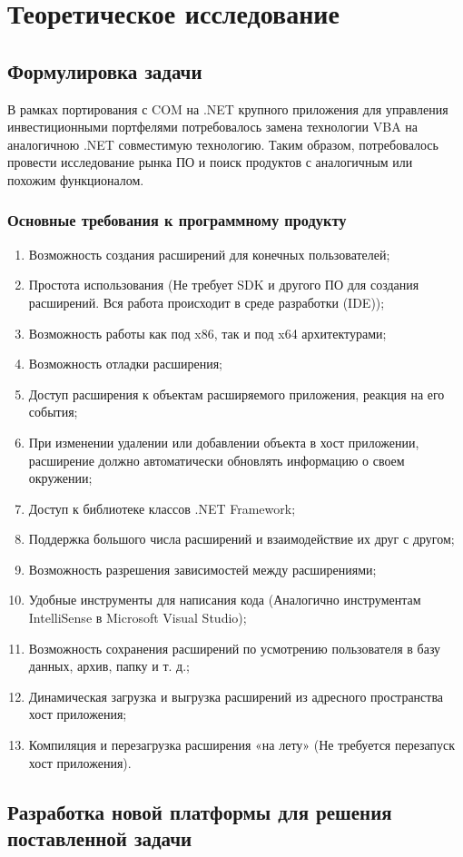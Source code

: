 \section{Теоретическое исследование}




\subsection{Формулировка задачи}

В рамках портирования с COM на .NET крупного приложения для управления инвестиционными портфелями потребовалось замена технологии VBA на аналогичною .NET совместимую технологию. Таким образом, потребовалось провести исследование рынка ПО и поиск продуктов с аналогичным или похожим функционалом.

\subsubsection{Основные требования к программному продукту}

\begin{enumerate}
\item Возможность создания расширений для конечных пользователей;
\item Простота использования (Не требует SDK и другого ПО для создания расширений. Вся работа происходит в среде разработки (IDE));
\item Возможность работы как под x86, так и под x64 архитектурами;
\item Возможность отладки расширения;
\item Доступ расширения к объектам расширяемого приложения, реакция на его события;
\item При изменении удалении или добавлении объекта в хост приложении, расширение должно автоматически обновлять информацию о своем окружении;
\item Доступ к библиотеке классов .NET Framework;
\item Поддержка большого числа расширений и взаимодействие их друг с другом;
\item Возможность разрешения зависимостей между расширениями;
\item Удобные инструменты для написания кода (Аналогично инструментам IntelliSense в Microsoft Visual Studio);
\item Возможность сохранения расширений по усмотрению пользователя в базу данных, архив, папку и т. д.;
\item Динамическая загрузка и выгрузка расширений из адресного пространства хост приложения;
\item Компиляция и перезагрузка расширения «на лету» (Не требуется перезапуск хост приложения).
\end{enumerate}



\subsection{Разработка новой платформы для решения поставленной задачи}

\pagebreak
